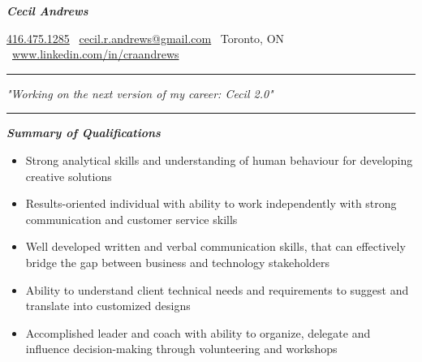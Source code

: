 \documentclass{article}
\begin{document}
\begin{center}
   
\Huge \textcolor{ablue}{\textit{\textbf{Cecil Andrews}}}

\end{center}

\begin{center}
 
    \href{tel:+1 416.475.1285}{416.475.1285} \textbar  \ \href{mailto:cecil.r.andrews@gmail.com}{cecil.r.andrews@gmail.com}  \textbar  \ Toronto, ON  \textbar  \  \href{http://www.linkedin.com/in/craandrews}{www.linkedin.com/in/craandrews}

\end{center}

\begin{group} 
\noindent
{\color{ablue} \rule{\linewidth}{0.5mm} }
\begin{center}
 \textcolor{ablue}{\textit{\LARGE"Working on the next version of my career: Cecil 2.0"}}
\end{center}
\noindent
{\color{ablue} \rule{\linewidth}{0.5mm} }
\end{group}

\begin{center}
\large \textcolor{ablue}{\textit{\textbf{Summary of Qualifications}}}
\end{center}


\begin{flushleft}
\begin{itemize}
\item Strong analytical skills and understanding of human behaviour for developing creative solutions\\
\item Results-oriented individual with ability to work independently with strong communication and customer service skills \\
\item Well developed written and verbal communication skills, that can effectively bridge the gap between business and technology stakeholders \\
\item Ability to understand client technical needs and requirements to suggest and translate into customized designs\\
\item Accomplished leader and  coach with ability to organize, delegate and influence decision-making through volunteering and workshops
\end{itemize}
\end{flushleft}
\end{document}
